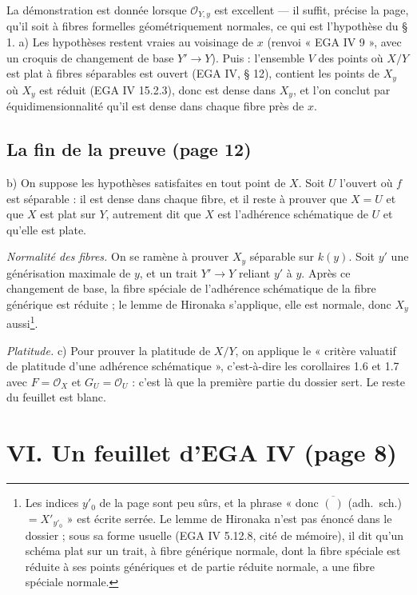 \documentclass[11pt,a4paper]{article}
\begin{document}
La démonstration est donnée lorsque $\mathcal{O}_{Y,y}$ est excellent --- il
suffit, précise la page, qu'il soit à fibres formelles géométriquement
normales, ce qui est l'hypothèse du § 1. a) Les hypothèses restent vraies au
voisinage de $x$ (renvoi « EGA IV 9 », avec un croquis de changement de base
$Y' \to Y$). Puis : l'ensemble $V$ des points où $X/Y$ est plat à fibres
séparables est ouvert (EGA IV, § 12), contient les points de $X_y$ où $X_y$ est
réduit (EGA IV 15.2.3), donc est dense dans $X_y$, et l'on conclut par
équidimensionnalité qu'il est dense dans chaque fibre près de $x$.

\subsection*{La fin de la preuve (page 12)}

b) On suppose les hypothèses satisfaites en tout point de $X$. Soit $U$
l'ouvert où $f$ est séparable : il est dense dans chaque fibre, et il reste à
prouver que $X = U$ et que $X$ est plat sur $Y$, autrement dit que $X$ est
l'adhérence schématique de $U$ et qu'elle est plate.

\emph{Normalité des fibres.} On se ramène à prouver $X_y$ séparable sur
$k(y)$. Soit $y'$ une générisation maximale de $y$, et un trait $Y' \to Y$
reliant $y'$ à $y$. Après ce changement de base, la fibre spéciale de
l'adhérence schématique de la fibre générique est réduite ; le lemme de
Hironaka s'applique, elle est normale, donc $X_y$ aussi\footnote{Les indices
$y'_0$ de la page sont peu sûrs, et la phrase « donc $\overline{(\ )}$ (adh.\
sch.)\ $= X'_{y'_0}$ » est écrite serrée. Le lemme de Hironaka n'est pas énoncé
dans le dossier ; sous sa forme usuelle (EGA IV 5.12.8, cité de mémoire), il
dit qu'un schéma plat sur un trait, à fibre générique normale, dont la fibre
spéciale est réduite à ses points génériques et de partie réduite normale, a
une fibre spéciale normale.}.

\emph{Platitude.} c) Pour prouver la platitude de $X/Y$, on applique le
« critère valuatif de platitude d'une adhérence schématique », c'est-à-dire
les corollaires 1.6 et 1.7 avec $F = \mathcal{O}_X$ et $G_U = \mathcal{O}_U$ :
c'est là que la première partie du dossier sert. Le reste du feuillet est
blanc.

\section*{VI. Un feuillet d'EGA IV (page 8)}
\end{document}
